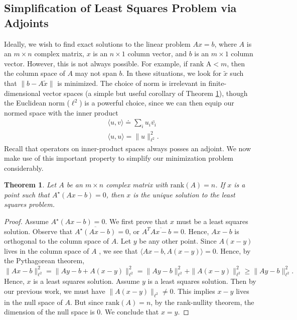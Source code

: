 \documentclass[12pt]{article}
\theoremstyle{plain}
\newtheorem{theorem}{Theorem}
\theoremstyle{definition}
\theoremstyle{remark}
\numberwithin{equation}{section}  %
\begin{document}
\subsection{Simplification of Least Squares Problem via Adjoints} 
Ideally, we wish to find exact solutions to the linear problem $Ax = b$, where
$A$ is an $m \times n$ complex matrix, $x$ is an $n \times 1$ column vector, and
$b$ is an $m \times 1$ column vector. However, this is not always possible. For
example, if $\text{rank A} < m$, then the column space of $A$ may not span $b$.
In these situations, we look for $\tilde{x}$ such that $ \| b - A\tilde{x}\|$ is
minimized. The choice of norm is irrelevant in finite-dimensional vector spaces (a
simple but useful corollary of Theorem \ref{thm:adj-ls}),
though the Euclidean norm ($\ell^2$) is a powerful choice, since we can then
equip our normed space with the inner product
\begin{equation*}
	\begin{split}
		& \langle u, v \rangle \doteq \sum_i u_i \bar{v_i}
		\\
		&  \langle u, u \rangle =\| u \|_{\ell^2}^2.
	\end{split}
\end{equation*}
Recall that operators on inner-product spaces always posses an adjoint. We now
make use of this important property to simplify our minimization problem
considerably.
\begin{theorem}
	\label{thm:adj-ls}
	Let $A$ be an $m \times n$ complex matrix with $\text{rank}(A) = n$. 
	If $x$ is a point such that $A^{\star} (Ax - b) = 0$, then $x$ is the unique solution 
	to the least squares problem.
\end{theorem} 
\begin{proof}
	Assume $A^{\star}(Ax-b) = 0$. We first prove that $x$ must be a least squares solution. Observe that
	$\overline{A^{\star}(Ax-b)} = 0$, or $A^T
	\overline{Ax-b} = 0$. Hence, $Ax-b$ is orthogonal to the column space of $A$. 
	Let $y$ be any other point. Since $A(x-y)$ lives in the column space of $A$
	, we see that $\langle Ax-b, A(x-y) \rangle = 0$. Hence, by the Pythagorean theorem,
	\begin{equation*}
		\| Ax - b \|_{\ell^2}^2 = \| Ay - b + A(x-y)
		\|_{\ell^2}^2 = \| Ay - b \|_{\ell^2}^2 + \| A(x-y) \|_{\ell^2}^2 \ge \| Ay - b
		\|_{\ell^2}^2.
	\end{equation*}
	Hence, $x$ is a least squares solution. Assume $y$ is a least squares solution. Then by our previous work, 
	we must have $ \| A(x - y) \|_{\ell^2} \neq 0$. This implies $x-y$ lives in the null space of $A$.
	But since $\text{rank}(A) = n$, by the rank-nullity theorem, the dimension of the null space 
	is $0$. We conclude that $x = y$. 
\end{proof}
\end{document}
